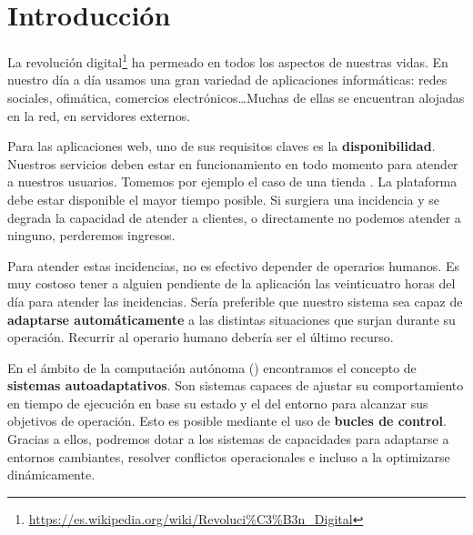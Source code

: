 
\chapter{Introducción}
\label{chap:introduccion}

La revolución digital\footnote{\url{https://es.wikipedia.org/wiki/Revoluci\%C3\%B3n_Digital}} ha permeado en todos los aspectos de nuestras vidas. En nuestro día a día usamos una gran variedad de aplicaciones informáticas: redes sociales, ofimática, comercios electrónicos\dots Muchas de ellas se encuentran alojadas en la red, en servidores externos.

Para las aplicaciones web, uno de sus requisitos claves es la \textbf{disponibilidad}. \cite{birmanAddingHighAvailability2004} Nuestros servicios deben estar en funcionamiento en todo momento para atender a nuestros usuarios. Tomemos por ejemplo el caso de una tienda . La plataforma debe estar disponible el mayor tiempo posible. Si surgiera una incidencia y se degrada la capacidad de atender a clientes, o directamente no podemos atender a ninguno, perderemos ingresos.

Para atender estas incidencias, no es efectivo depender de operarios humanos. \cite{ibmcorporationArchitecturalBlueprintAutonomic2006} Es muy costoso tener a alguien pendiente de la aplicación las veinticuatro horas del día para atender las incidencias. Sería preferible que nuestro sistema sea capaz de \textbf{adaptarse automáticamente} a las distintas situaciones que surjan durante su operación. Recurrir al operario humano debería ser el último recurso.

En el ámbito de la computación autónoma () encontramos el concepto de \textbf{sistemas autoadaptativos}. Son sistemas capaces de ajustar su comportamiento en tiempo de ejecución en base su estado y el del entorno para alcanzar sus objetivos de operación. \cite{ibmcorporationArchitecturalBlueprintAutonomic2006} Esto es posible mediante el uso de \textbf{bucles de control}. \cite{brunEngineeringSelfAdaptiveSystems2009} Gracias a ellos, podremos dotar a los sistemas de capacidades para adaptarse a entornos cambiantes, resolver conflictos operacionales e incluso a la optimizarse dinámicamente.


